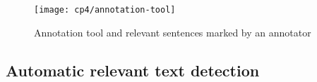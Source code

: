 \begin{figure}
    \centering
    \texttt{[image: cp4/annotation-tool]}
    \caption{Annotation tool and relevant sentences marked by an annotator}
    \label{fig:corpus-annotation-tool}
\end{figure}



\subsection{Automatic relevant text detection}
\label{cp4:relevant-text-auto}









    
    



